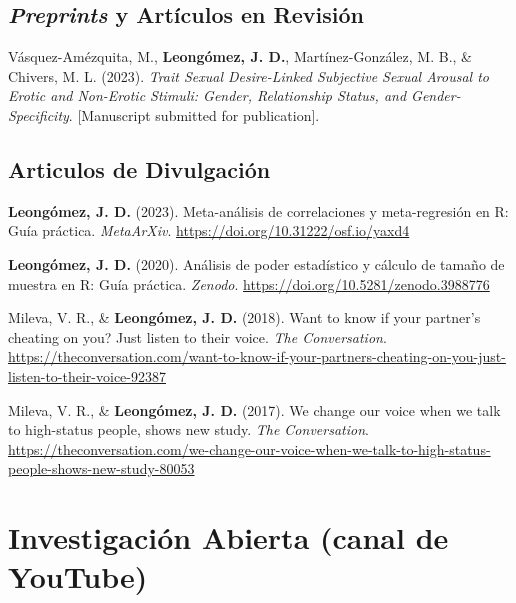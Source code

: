\documentclass[11pt,a4paper,]{awesome-cv}
\begin{document}
\endgroup

\hypertarget{section-1}{%
\subsection{\texorpdfstring{\textbf{\textit{Preprints} y Artículos en Revisión}}{}}\label{section-1}}

\begingroup
\footnotesize
\setlength{\parindent}{-0.5in}
\setlength{\leftskip}{0.5in}

Vásquez-Amézquita, M., \textbf{Leongómez, J. D.}, Martínez-González, M.
B., \& Chivers, M. L. (2023). \emph{Trait Sexual Desire-Linked
Subjective Sexual Arousal to Erotic and Non-Erotic Stimuli: Gender,
Relationship Status, and Gender-Specificity}. {[}Manuscript submitted
for publication{]}.

\endgroup

\hypertarget{section-2}{%
\subsection{\texorpdfstring{\textbf{Articulos de Divulgación}}{}}\label{section-2}}

\begingroup
\footnotesize
\setlength{\parindent}{-0.5in}
\setlength{\leftskip}{0.5in}

\textbf{Leongómez, J. D.} (2023). Meta-análisis de correlaciones y
meta-regresión en R: Guía práctica. \emph{MetaArXiv}.
\url{https://doi.org/10.31222/osf.io/yaxd4}

\textbf{Leongómez, J. D.} (2020). Análisis de poder estadístico y
cálculo de tamaño de muestra en R: Guía práctica. \emph{Zenodo}.
\url{https://doi.org/10.5281/zenodo.3988776}

Mileva, V. R., \& \textbf{Leongómez, J. D.} (2018). Want to know if your
partner's cheating on you? Just listen to their voice. \emph{The
Conversation}.
\url{https://theconversation.com/want-to-know-if-your-partners-cheating-on-you-just-listen-to-their-voice-92387}

Mileva, V. R., \& \textbf{Leongómez, J. D.} (2017). We change our voice
when we talk to high-status people, shows new study. \emph{The
Conversation}.
\url{https://theconversation.com/we-change-our-voice-when-we-talk-to-high-status-people-shows-new-study-80053}

\endgroup

\hypertarget{investigaciuxf3n-abierta-canal-de-youtube}{%
\section{Investigación Abierta (canal de
YouTube)}\label{investigaciuxf3n-abierta-canal-de-youtube}}
\end{document}

